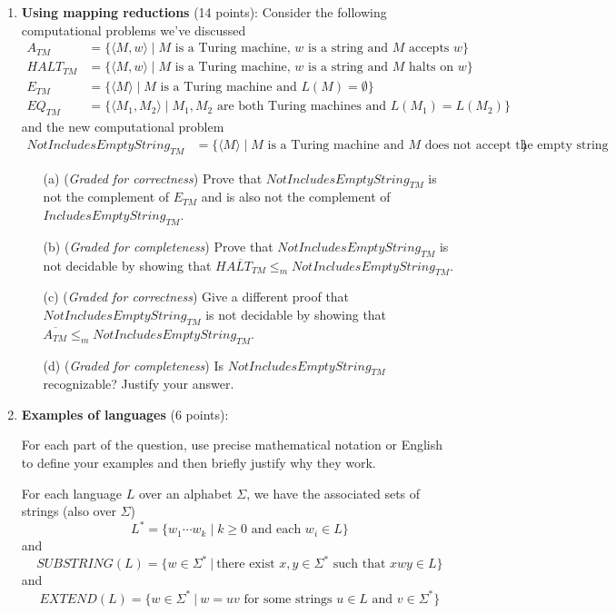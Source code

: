 \documentclass[12pt, oneside]{article}
\newcommand{\gradeCorrect}{({\it Graded for correctness}) }
\newcommand{\gradeComplete}{({\it Graded for completeness}) }
\begin{document}
\begin{enumerate}[wide, labelwidth=!, labelindent=0pt]
\item\textbf{Using mapping reductions} (14 points):
Consider the following computational problems we've discussed
\begin{align*}
A_{TM} &= \{ \langle M, w \rangle \mid M \text{ is a Turing machine, } w \text{ is a string and $M$ accepts $w$}\} \\
HALT_{TM} &= \{ \langle M, w \rangle \mid M \text{ is a Turing machine, } w \text{ is a string and $M$ halts on $w$}\} \\
E_{TM} &=  \{ \langle M \rangle \mid M \text{ is a Turing machine and } L(M) = \emptyset\} \\
EQ_{TM} &= \{ \langle M_1, M_2 \rangle \mid M_1, M_2 \text{ are both Turing machines and } L(M_1) = L(M_2) \}
\end{align*}
and the new computational problem
\begin{align*}
    NotIncludesEmptyString_{TM} &= \{ \langle M \rangle \mid M \text{ is a Turing machine and $M$ does not accept the empty string} \}
\end{align*}
\begin{enumerate}
\item[(a)] \gradeCorrect Prove that $NotIncludesEmptyString_{TM}$ is not the complement of $E_{TM}$ and is also not the complement of $IncludesEmptyString_{TM}$.
\item[(b)] \gradeComplete Prove that $NotIncludesEmptyString_{TM}$ is not decidable by showing that $\overline{HALT_{TM}} \leq_m NotIncludesEmptyString_{TM}$.
\item[(c)] \gradeCorrect Give a different proof that $NotIncludesEmptyString_{TM}$ is not decidable by showing that $\overline{A_{TM}} \leq_m NotIncludesEmptyString_{TM}$. 
\item[(d)] \gradeComplete Is $NotIncludesEmptyString_{TM}$ recognizable? Justify your answer.
\end{enumerate}


\item \textbf{Examples of languages} (6 points):

For each part of the question, use precise mathematical notation or English to define your examples
and then briefly justify why they work.


For each language $L$ over an alphabet $\Sigma$, we have the 
associated sets of strings (also over $\Sigma$)
\[
    L^* = \{ w_1 \cdots w_k \mid k \geq 0 \textrm{ and each } w_i \in L\}
\]
and
\[
    SUBSTRING(L) = \{ w \in \Sigma^* ~|~ \text{there exist } x,y \in \Sigma^* \text{ such that } xwy \in L\}
\]
and 
\[
    EXTEND(L) = \{ w \in \Sigma^* ~|~ w = uv \text{ for some strings } u \in L \text{ and } v \in \Sigma^* \}
\]


\end{enumerate}
\end{document}

